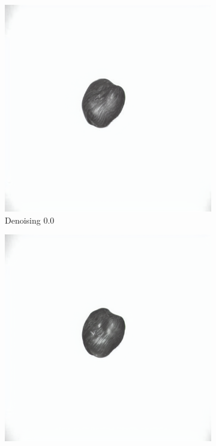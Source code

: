 \documentclass[12pt,DIV14,BCOR12mm,a4paper,footinclude=false,headinclude,parskip=half-,twoside,openright,cleardoublepage=empty,toc=index,bibliography=totoc,listof=totoc]{scrreprt}
\numberwithin{equation}{chapter}
\begin{document}
\begin{figure}
\begin{subfigure}{0.14\textwidth}
        \includegraphics[width=\linewidth]{../media/image_0.0.png} %
        \caption{Denoising 0.0}
    \end{subfigure}
    \begin{subfigure}{0.14\textwidth}
        \centering
        \includegraphics[width=\linewidth]{../media/image_0.1.png} %

\end{subfigure}
\end{figure}
\end{document}
